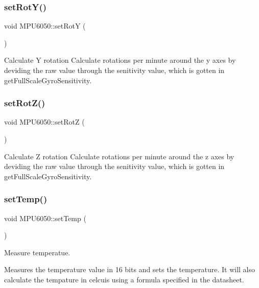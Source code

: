\subsubsection{\texorpdfstring{set\+Rot\+Y()}{setRotY()}}
{\footnotesize\ttfamily void M\+P\+U6050\+::set\+RotY (\begin{DoxyParamCaption}{ }\end{DoxyParamCaption})}



Calculate Y rotation  Calculate rotations per minute around the y axes by deviding the raw value through the senitivity value, which is gotten in get\+Full\+Scale\+Gyro\+Sensitivity. 

\mbox{\label{class_m_p_u6050_a731b428be8965d86832124c0e429019d}} 
\subsubsection{\texorpdfstring{set\+Rot\+Z()}{setRotZ()}}
{\footnotesize\ttfamily void M\+P\+U6050\+::set\+RotZ (\begin{DoxyParamCaption}{ }\end{DoxyParamCaption})}



Calculate Z rotation  Calculate rotations per minute around the z axes by deviding the raw value through the senitivity value, which is gotten in get\+Full\+Scale\+Gyro\+Sensitivity. 

\mbox{\label{class_m_p_u6050_abbd800900f0d3a98265277e1b8f7127e}} 
\subsubsection{\texorpdfstring{set\+Temp()}{setTemp()}}
{\footnotesize\ttfamily void M\+P\+U6050\+::set\+Temp (\begin{DoxyParamCaption}{ }\end{DoxyParamCaption})}



Measure temperatue. 

Measures the temperature value in 16 bits and sets the temperature. It will also calculate the tempature in celcuis using a formula specified in the datasheet. \mbox{\label{class_m_p_u6050_a14d45cb8c0d8744bd280ca7d05e5d962}} 
